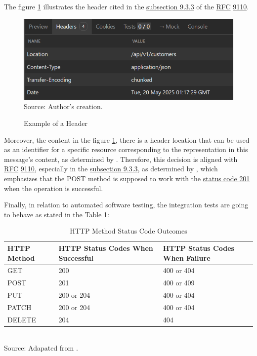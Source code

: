 The figure \ref{fig:http_header} illustrates the header cited in the \href{https://www.rfc-editor.org/rfc/rfc9110.html#name-post}{subsection 9.3.3} of the \hyperref[appendix:glossary]{RFC} \href{https://www.rfc-editor.org/rfc/rfc9110.html}{9110}.

\begin{figure}[H]
	\centering
	\caption{Example of a Header}
	\includegraphics[width=0.9\linewidth]{figures/http/http_header.png}
	\label{fig:http_header}
	\\ \footnotesize Source: Author's creation.
\end{figure}

Moreover, the content in the figure \ref{fig:http_header}, there is a header location that can be used as an identifier for a specific resource corresponding to the representation in this message's content, as determined by \cite{rfc9110}. Therefore, this decision is aligned with \hyperref[appendix:glossary]{RFC} \href{https://www.rfc-editor.org/rfc/rfc9110.html}{9110}, especially in the \href{https://www.rfc-editor.org/rfc/rfc9110.html#name-post}{subsection 9.3.3}, as determined by \cite{rfc9110}, which emphasizes that the POST method is supposed to work with the \hyperref[tab:summary_http_status_codes]{status code 201} when the operation is successful.

Finally, in relation to automated software testing, the integration tests are going to behave as stated in the
Table \ref{tab:related-statuses-methods}:

\begin{table}[H]
\centering  
\caption{HTTP Method Status Code Outcomes}   
\label{tab:related-statuses-methods}    
\begin{tabular}{lll}
\textbf{HTTP Method} & \textbf{HTTP Status Codes When Successful} & \textbf{HTTP Status Codes When Failure} \\   
\hline   
GET & 200 & 400 or 404 \\ \hline   
POST & 201 & 400 or 409 \\ \hline   
PUT & 200 or 204 & 400 or 404 \\ \hline   
PATCH & 200 or 204 & 400 or 404 \\ \hline   
DELETE & 204 & 404 \\ \hline   
\end{tabular}  
\\ \footnotesize Source: Adapated from \cite{rfc9110}.
\end{table}

